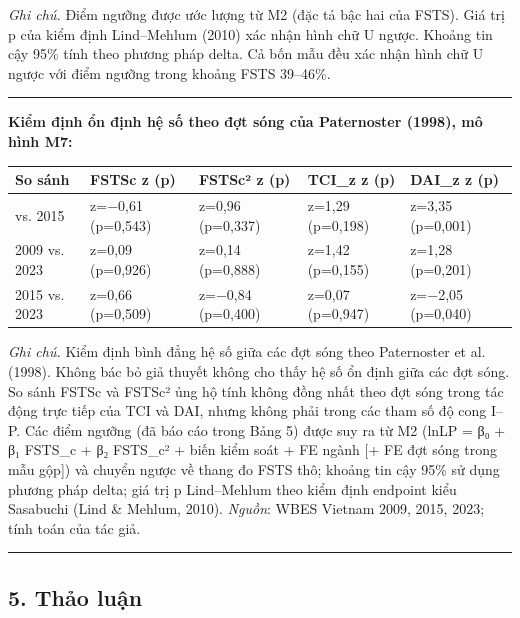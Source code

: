\documentclass[12pt,a4paper]{article}
\begin{document}
\emph{Ghi chú.} Điểm ngưỡng được ước lượng từ M2 (đặc tả bậc hai của
FSTS). Giá trị p của kiểm định Lind--Mehlum (2010) xác nhận hình chữ U
ngược. Khoảng tin cậy 95\% tính theo phương pháp delta. Cả bốn mẫu đều
xác nhận hình chữ U ngược với điểm ngưỡng trong khoảng FSTS 39--46\%.

\begin{center}\rule{0.5\linewidth}{0.5pt}\end{center}

\textbf{Kiểm định ổn định hệ số theo đợt sóng của Paternoster (1998), mô
hình M7:}

\begin{longtable}[]{@{}lllll@{}}
\toprule\noalign{}
So sánh & FSTSc z (p) & FSTSc² z (p) & TCI\_z z (p) & DAI\_z z (p) \\
\midrule\noalign{}
\endhead
\bottomrule\noalign{}
\endlastfoot
2009 vs. 2015 & z=−0,61 (p=0,543) & z=0,96 (p=0,337) & z=1,29 (p=0,198)
& z=3,35 (p=0,001) \\
2009 vs. 2023 & z=0,09 (p=0,926) & z=0,14 (p=0,888) & z=1,42 (p=0,155) &
z=1,28 (p=0,201) \\
2015 vs. 2023 & z=0,66 (p=0,509) & z=−0,84 (p=0,400) & z=0,07 (p=0,947)
& z=−2,05 (p=0,040) \\
\end{longtable}

\emph{Ghi chú.} Kiểm định bình đẳng hệ số giữa các đợt sóng theo
Paternoster et al. (1998). Không bác bỏ giả thuyết không cho thấy hệ số
ổn định giữa các đợt sóng. So sánh FSTSc và FSTSc² ủng hộ tính không
đồng nhất theo đợt sóng trong tác động trực tiếp của TCI và DAI, nhưng
không phải trong các tham số độ cong I--P. Các điểm ngưỡng (đã báo cáo
trong Bảng 5) được suy ra từ M2 (lnLP = β₀ + β₁ FSTS\_c + β₂ FSTS\_c² +
biến kiểm soát + FE ngành {[}+ FE đợt sóng trong mẫu gộp{]}) và chuyển
ngược về thang đo FSTS thô; khoảng tin cậy 95\% sử dụng phương pháp
delta; giá trị p Lind--Mehlum theo kiểm định endpoint kiểu Sasabuchi
(Lind \& Mehlum, 2010). \emph{Nguồn}: WBES Vietnam 2009, 2015, 2023;
tính toán của tác giả.

\begin{center}\rule{0.5\linewidth}{0.5pt}\end{center}

\hypertarget{5-thux1ea3o-luux1eadn}{%
\subsection{5. Thảo luận}\label{5-thux1ea3o-luux1eadn}}
\end{document}
